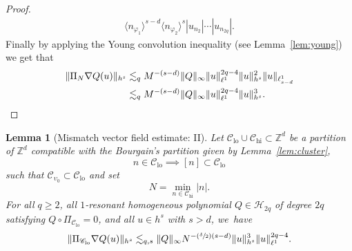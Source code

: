 \documentclass[JEP,XML,SOM,Unicode,published]{cedram}
\newcommand{\Psfrac}[2]{(\sfrac{#1}{#2})}
\theoremstyle{plain}
\newtheorem{lemma}[theorem]{Lemma}
\theoremstyle{definition}
\DeclareMathOperator{\hi}{hi}
\DeclareMathOperator{\lo}{lo}
\newcommand{\1}{\mathbf{1}}
\newcommand{\Clo}{\mathscr{C}_{\lo}}
\newcommand{\Chigh}{\mathscr{C}_{\hi}}
\begin{document}
\begin{proof}
\begin{equation*}
\begin{split}
\langle n_{\varphi_1}\rangle^{s-d} \langle n_{\varphi_2}\rangle^{s}
|u_{n_{2}}|\cdots|u_{n_{2q}}|.
\end{split}
\end{equation*}
Finally by applying the Young convolution inequality (see Lemma~\ref{lem:young}) we get that
\begin{align*}
\|\Pi_N\nabla Q(u) \|_{h^s} &\lesssim_q M^{-(s-d)} \|Q\|_{\infty} \| u\|_{\ell^1}^{2q-4} \| u \|_{h^s}^2 \| u\|_{\ell^1_{s-d}} \\ &\lesssim_q M^{-(s-d)} \|Q\|_{\infty} \| u\|_{\ell^1}^{2q-4} \| u \|_{h^s}^3.\qedhere
\end{align*}
\end{proof}

\begin{lemma}[Mismatch vector field estimate: II]
\label{lem:misII}
Let
$\Clo\cup \Chigh \subset \mathbb{Z}^d$ be a partition of $\mathbb{Z}^d$ compatible with the Bourgain's partition given by Lemma~\ref{lem:cluster}, \ie
\[
n\in \Clo \implies [n] \subset \Clo
\]
such that $\mathscr{C}_{\upsilon_0} \subset \Clo$ and set\vspace*{-3pt}
\[
N = \min_{n \in \Chigh} |n|.
\]
For all $q\geq 2$, all $1$-resonant homogeneous polynomial $Q\in\mathcal{H}_{2q}$ of degree $2q$ satisfying $Q\circ \Pi_{\Clo}=0$, and all $u\in h^{s}$ with $s>d$, we~have\vspace*{-3pt}
\begin{equation*}
\label{eq:misII}
\|\Pi_{\Clo} \nabla Q(u)\|_{h^{s}} \lesssim_{q,s} \| Q\|_{\infty} N^{-\Psfrac{\delta}{2}(s-d)}\|u\|_{h^{s}}^{3}\|u\|_{\ell^{1}}^{2q-4}.
\end{equation*}
\end{lemma}
\end{document}
